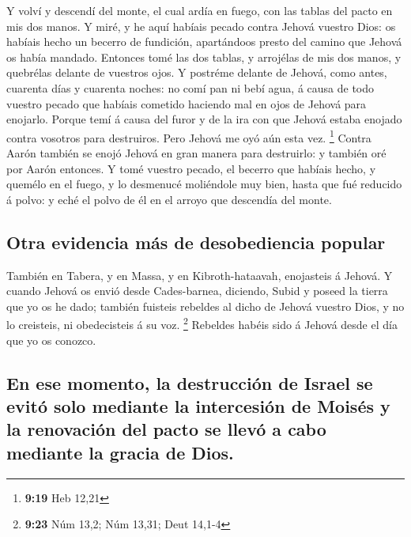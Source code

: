  Y volví y descendí del monte, el cual ardía en fuego, con
las tablas del pacto en mis dos manos.  Y miré, y he aquí
habíais pecado contra Jehová vuestro Dios: os habíais hecho un becerro
de fundición, apartándoos presto del camino que Jehová os había mandado.
 Entonces tomé las dos tablas, y arrojélas de mis dos
manos, y quebrélas delante de vuestros ojos.  Y postréme
delante de Jehová, como antes, cuarenta días y cuarenta noches: no comí
pan ni bebí agua, á causa de todo vuestro pecado que habíais cometido
haciendo mal en ojos de Jehová para enojarlo.  Porque temí
á causa del furor y de la ira con que Jehová estaba enojado contra
vosotros para destruiros. Pero Jehová me oyó aún esta vez. \footnote{\textbf{9:19}
  Heb 12,21}  Contra Aarón también se enojó Jehová en gran
manera para destruirlo: y también oré por Aarón entonces. 
Y tomé vuestro pecado, el becerro que habíais hecho, y quemélo en el
fuego, y lo desmenucé moliéndole muy bien, hasta que fué reducido á
polvo: y eché el polvo de él en el arroyo que descendía del monte.

\hypertarget{otra-evidencia-muxe1s-de-desobediencia-popular}{%
\subsection{Otra evidencia más de desobediencia
popular}\label{otra-evidencia-muxe1s-de-desobediencia-popular}}

 También en Tabera, y en Massa, y en Kibroth-hataavah,
enojasteis á Jehová.  Y cuando Jehová os envió desde
Cades-barnea, diciendo, Subid y poseed la tierra que yo os he dado;
también fuisteis rebeldes al dicho de Jehová vuestro Dios, y no lo
creisteis, ni obedecisteis á su voz. \footnote{\textbf{9:23} Núm 13,2;
  Núm 13,31; Deut 14,1-4}  Rebeldes habéis sido á Jehová
desde el día que yo os conozco.

\hypertarget{en-ese-momento-la-destrucciuxf3n-de-israel-se-evituxf3-solo-mediante-la-intercesiuxf3n-de-moisuxe9s-y-la-renovaciuxf3n-del-pacto-se-llevuxf3-a-cabo-mediante-la-gracia-de-dios.}{%
\subsection{En ese momento, la destrucción de Israel se evitó solo
mediante la intercesión de Moisés y la renovación del pacto se llevó a
cabo mediante la gracia de
Dios.}\label{en-ese-momento-la-destrucciuxf3n-de-israel-se-evituxf3-solo-mediante-la-intercesiuxf3n-de-moisuxe9s-y-la-renovaciuxf3n-del-pacto-se-llevuxf3-a-cabo-mediante-la-gracia-de-dios.}}

